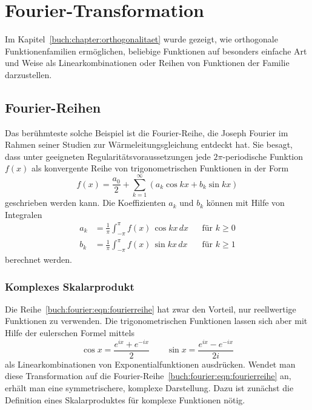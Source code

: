 %
%
%
\section{Fourier-Transformation
\label{buch:fourier:section:fourier}}
Im Kapitel~\ref{buch:chapter:orthogonalitaet}
wurde gezeigt, wie orthogonale Funktionenfamilien ermöglichen,
beliebige Funktionen auf besonders einfache Art und Weise
als Linearkombinationen oder Reihen von Funktionen der Familie
darzustellen.

%
%
\subsection{Fourier-Reihen}
Das berühmteste solche Beispiel ist die Fourier-Reihe, die
Joseph Fourier im Rahmen seiner Studien zur Wärmeleitungsgleichung
entdeckt hat.
Sie besagt, dass unter geeigneten Regularitätsvoraussetzungen
jede $2\pi$-periodische Funktion $f(x)$ als konvergente Reihe von
trigonometrischen Funktionen in der Form
\begin{equation}
f(x)
=
\frac{a_0}2
+
\sum_{k=1}^\infty (a_k \cos kx + b_k \sin kx)
\label{buch:fourier:eqn:fourierreihe}
\end{equation}
geschrieben werden kann.
Die Koeffizienten $a_k$ und $b_k$ können mit Hilfe von Integralen
\[
\begin{aligned}
a_k
&=
\frac{1}{\pi}
\int_{-\pi}^\pi f(x)\, \cos kx\,dx
&&\text{für $k\ge 0$}
\\
b_k
&=
\frac{1}{\pi}
\int_{-\pi}^\pi f(x)\, \sin kx\,dx
&&\text{für $k\ge 1$}
\end{aligned}
\]
berechnet werden.

%
%
\subsubsection{Komplexes Skalarprodukt}
Die Reihe~\eqref{buch:fourier:eqn:fourierreihe} hat zwar den Vorteil,
nur reellwertige Funktionen zu verwenden.
Die trigonometrischen Funktionen lassen sich aber mit Hilfe der
eulerschen Formel mittels
\[
\cos x = \frac{e^{ix}+e^{-ix}}{2}
\qquad
\sin x = \frac{e^{ix}-e^{-ix}}{2i}
\]
als Linearkombinationen von Exponentialfunktionen ausdrücken.
Wendet man diese Transformation auf
die Fourier-Reihe~\eqref{buch:fourier:eqn:fourierreihe}
an, erhält man eine symmetrischere, komplexe Darstellung.
Dazu ist zunächst die Definition eines Skalarproduktes für komplexe
Funktionen nötig.

